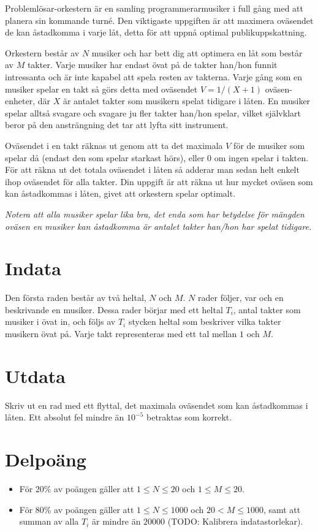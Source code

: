 
Problemlösar-orkestern är en samling programmerarmusiker i full gång med att planera sin kommande turné. Den viktigaste uppgiften är att maximera oväsendet de kan åstadkomma i varje låt, detta för att uppnå optimal publikuppskattning.

Orkestern består av $N$ musiker och har bett dig att optimera en låt som består av $M$ takter. Varje musiker har endast övat på de takter han/hon funnit intressanta och är inte kapabel att spela resten av takterna. Varje gång som en musiker spelar en takt så görs detta med oväsendet $V=1/(X+1)$ oväsen-enheter, där $X$ är antalet takter som musikern spelat tidigare i låten. En musiker spelar alltså svagare och svagare ju fler takter han/hon spelar, vilket självklart beror på den ansträngning det tar att lyfta sitt instrument.

Oväsendet i en takt räknas ut genom att ta det maximala $V$ för de musiker som spelar då (endast den som spelar starkast hörs), eller $0$ om ingen spelar i takten. För att räkna ut det totala oväsendet i låten så adderar man sedan helt enkelt ihop oväsendet för alla takter. Din uppgift är att räkna ut hur mycket oväsen som kan åstadkommas i låten, givet att orkestern spelar optimalt.

\emph{Notera att alla musiker spelar lika bra, det enda som har betydelse för mängden oväsen en musiker kan åstadkomma är antalet takter han/hon har spelat tidigare.}

\section*{Indata}
Den första raden består av två heltal, $N$ och $M$. $N$ rader följer, var och en beskrivande en musiker. Dessa rader börjar med ett heltal $T_i$, antal takter som musiker i övat in, och följs av $T_i$ stycken heltal som beskriver vilka takter musikern övat på. Varje takt representeras med ett tal mellan $1$ och $M$.

\section*{Utdata}
Skriv ut en rad med ett flyttal, det maximala oväsendet som kan åstadkommas i låten. Ett absolut fel mindre än $10^{-5}$ betraktas som korrekt.

\section*{Delpoäng}
\begin{itemize}
\item För 20\% av poängen gäller att $1 \leq N \leq 20$ och $1 \leq M \leq 20$.
\item För 80\% av poängen gäller att $1 \leq N \leq 1000$ och $20 < M \leq 1000$, samt att summan av alla $T_i$ är mindre än $20000$ (TODO: Kalibrera indatastorlekar).
\end{itemize}

